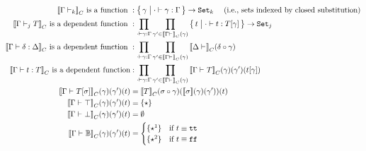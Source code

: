 \begin{align*}
  \denotesC{\goodCtx{\Gm}{k}} \text{ is a function }&: \setc{\gm}{\goodSub{\cdot}{\gm}{\Gm}} \to \Set{k} \quad \text{ (i.e., sets indexed by closed substitution)}\\
  \denotesC{\goodType{\Gm}{T}{j}} \text{ is a dependent function }&: \prod_{\goodSub{\cdot}{\gm}{\Gm}}\prod_{\gm' \in \denotesC{\goodCtx{\Gm}{}}(\gm)}\setc{t}{\goodTerm{\cdot}{t}{\sub{T}{\gm}}}\to\Set{j} \\
  \denotesC{\goodSub{\Gm}{\delta}{\Delta}} \text{ is a dependent function }&: \prod_{\goodSub{\cdot}{\gm}{\Gm}} \prod_{\gm' \in \denotesC{\goodCtx{\Gm}{}}(\gm)} \denotesC{\goodCtx{\Dl}{}}(\delta \circ \gm) \\
  \denotesC{\goodTerm{\Gm}{t}{T}} \text{ is a dependent function}&: \prod_{\goodSub{\cdot}{\gm}{\Gm}} \prod_{\gm' \in \denotesC{\goodCtx{\Gm}{}}(\gm)}\denotesC{\goodType{\Gm}{T}{}}(\gm)(\gm')(\sub{t}{\gm})\\
  \denotesC{\goodType{\Gm}{\sub{T}{\sigma}}{}}(\gm)(\gm')(t) &= \denotesC{T}(\sigma \circ \gm)(\denotes{\sigma}(\gm)(\gm'))(t)\\
  \denotesC{\goodType{\Gm}{\top}{}}(\gm)(\gm')(t) &= \{\star \} \\
  \denotesC{\goodType{\Gm}{\bot}{}}(\gm)(\gm')(t) &= \emptyset \\
  \denotesC{\goodType{\Gm}{\cB}{}}(\gm)(\gm')(t) &= 
    \begin{cases}
      \{\star^1\} & \text{if } t \equiv \true \\
      \{\star^2\} & \text{if } t \equiv \false \\

\end{cases}
\end{align*}
